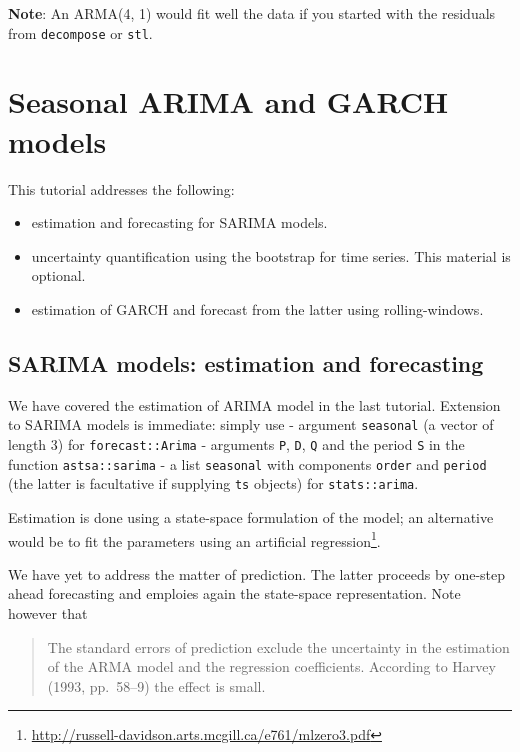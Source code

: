 \documentclass[]{book}
\providecommand{\tightlist}{%
  \setlength{\itemsep}{0pt}\setlength{\parskip}{0pt}}
\let\rmarkdownfootnote\footnote%
\def\footnote{\protect\rmarkdownfootnote}
\renewcommand{\href}[2]{#2\footnote{\url{#1}}}
\begin{document}
\textbf{Note}: An ARMA(4, 1) would fit well the data if you started with the residuals from \texttt{decompose} or \texttt{stl}.

\hypertarget{seasonal-arima-and-garch-models}{%
\chapter{Seasonal ARIMA and GARCH models}\label{seasonal-arima-and-garch-models}}

This tutorial addresses the following:

\begin{itemize}
\tightlist
\item
  estimation and forecasting for SARIMA models.
\item
  uncertainty quantification using the bootstrap for time series. This material is optional.
\item
  estimation of GARCH and forecast from the latter using rolling-windows.
\end{itemize}

\hypertarget{sarima-models-estimation-and-forecasting}{%
\section{SARIMA models: estimation and forecasting}\label{sarima-models-estimation-and-forecasting}}

We have covered the estimation of ARIMA model in the last tutorial. Extension to SARIMA models is immediate: simply use
- argument \texttt{seasonal} (a vector of length 3) for \texttt{forecast::Arima}
- arguments \texttt{P}, \texttt{D}, \texttt{Q} and the period \texttt{S} in the function \texttt{astsa::sarima}
- a list \texttt{seasonal} with components \texttt{order} and \texttt{period} (the latter is facultative if supplying \texttt{ts} objects) for \texttt{stats::arima}.

Estimation is done using a state-space formulation of the model; an alternative would be to fit the parameters using \href{http://russell-davidson.arts.mcgill.ca/e761/mlzero3.pdf}{an artificial regression}.

We have yet to address the matter of prediction. The latter proceeds by one-step ahead forecasting and emploies again the state-space representation. Note however that

\begin{quote}
The standard errors of prediction exclude the uncertainty in the estimation of the ARMA model and the regression coefficients. According to Harvey (1993, pp.~58--9) the effect is small.
\end{quote}
\end{document}
